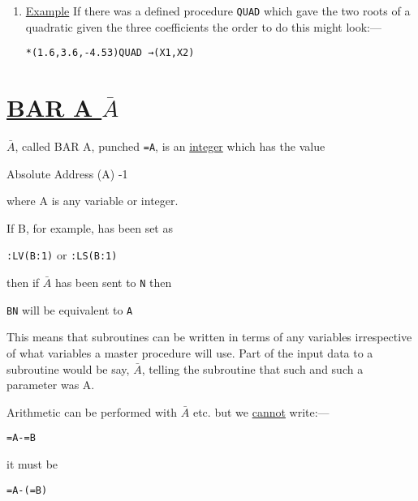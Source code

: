 \documentclass[10pt, a4paper, oneside]{article}
\newcommand{\myuline}[1]{\uline{#1}}
\newcommand{\mytt}[1]{\texttt{\scriptsize #1}}
\newcommand{\mytt}[1]{\texttt{\small #1}}
\begin{document}
\begin{multicols}{2}
\begin{enumerate}
\item \myuline{Example} If there was a defined procedure \mytt{QUAD}
which gave the two roots of a quadratic given the three
coefficients the order to do this might look:—

\begin{addmargin}[1cm]{1em}%
\begin{lstlisting}
*(1.6,3.6,-4.53)QUAD →(X1,X2)
\end{lstlisting}
\end{addmargin}

\end{enumerate}


\section{\myuline{BAR A $\bar{A}$}}

$\bar{A}$, called BAR A, punched \mytt{=A}, is an \myuline{integer} which
has the value

Absolute Address (A) -1

where A is any variable or integer.

If B, for example, has been set as

\begin{addmargin}[1cm]{1em}%
\mytt{:LV(B:1)} or \mytt{:LS(B:1)}
\end{addmargin}

then if $\bar{A}$ has been sent to \mytt{N} then

\mytt{BN}  will be equivalent to \mytt{A}

This means that subroutines can be written in
terms of any variables irrespective of what variables a
master procedure will use.  Part of the input data to
a subroutine would be say, $\bar{A}$, telling the subroutine
that such and such a parameter was A.

Arithmetic can be performed with $\bar{A}$ etc. but we
\myuline{cannot} write:—

\begin{addmargin}[1cm]{1em}%
\begin{lstlisting}
=A-=B
\end{lstlisting}
\end{addmargin}

\begin{flushleft}
it must be
\end{flushleft}

\begin{addmargin}[1cm]{1em}%
\begin{lstlisting}
=A-(=B)
\end{lstlisting}
\end{addmargin}


\end{multicols}
\end{document}
